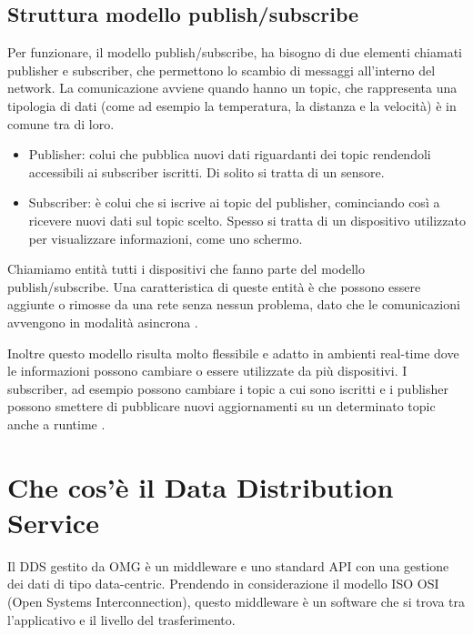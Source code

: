 \subsection{Struttura modello publish/subscribe}
Per funzionare, il modello publish/subscribe, ha bisogno di
due elementi chiamati publisher e subscriber, 
che permettono lo scambio di messaggi all'interno del network.
La comunicazione avviene 
quando hanno un topic, che
rappresenta una tipologia di dati (come ad esempio la temperatura, 
la distanza e la velocità) è in comune tra di loro.
\begin{itemize}
    \item Publisher: colui che pubblica nuovi dati riguardanti dei
    topic rendendoli accessibili ai subscriber iscritti. 
    Di solito si tratta di un sensore.
    \item Subscriber: è colui che si iscrive ai topic del publisher, 
    cominciando
    così a ricevere nuovi dati sul topic scelto. Spesso si tratta
    di un dispositivo utilizzato per visualizzare informazioni, come uno
    schermo.
\end{itemize}
Chiamiamo entità tutti i dispositivi che fanno parte del modello 
publish/subscribe.
Una caratteristica di queste entità è che possono essere aggiunte o rimosse
da una rete senza nessun problema, dato che le 
comunicazioni avvengono in modalità asincrona \cite{dds1.4}. 

Inoltre questo modello risulta molto
flessibile e adatto in ambienti real-time dove le informazioni
possono cambiare o essere utilizzate da più dispositivi.
I subscriber, ad esempio possono cambiare i topic a cui 
sono iscritti e i publisher possono smettere di pubblicare nuovi
aggiornamenti su un determinato topic anche a runtime \cite{OH2010318}.

\section{Che cos'è il Data Distribution Service}

Il DDS gestito da OMG è un middleware e uno standard API con una gestione
dei dati di tipo data-centric. 
Prendendo in considerazione il modello ISO OSI 
(Open Systems Interconnection), questo
middleware è un software che si trova tra l'applicativo e il livello
del trasferimento.

